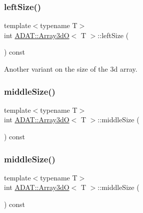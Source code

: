 \mbox{\label{classADAT_1_1Array3dO_a60f0fb62e8b93e6828fc98df271db054}} 
\subsubsection{\texorpdfstring{leftSize()}{leftSize()}\hspace{0.1cm}{\footnotesize\ttfamily [3/3]}}
{\footnotesize\ttfamily template$<$typename T$>$ \\
int \mbox{\hyperlink{classADAT_1_1Array3dO}{A\+D\+A\+T\+::\+Array3dO}}$<$ T $>$\+::left\+Size (\begin{DoxyParamCaption}{ }\end{DoxyParamCaption}) const\hspace{0.3cm}{\ttfamily [inline]}}



Another variant on the size of the 3d array. 

\mbox{\label{classADAT_1_1Array3dO_aff38cae908364701dc0fefd386223c55}} 
\subsubsection{\texorpdfstring{middleSize()}{middleSize()}\hspace{0.1cm}{\footnotesize\ttfamily [1/3]}}
{\footnotesize\ttfamily template$<$typename T$>$ \\
int \mbox{\hyperlink{classADAT_1_1Array3dO}{A\+D\+A\+T\+::\+Array3dO}}$<$ T $>$\+::middle\+Size (\begin{DoxyParamCaption}{ }\end{DoxyParamCaption}) const\hspace{0.3cm}{\ttfamily [inline]}}

\mbox{\label{classADAT_1_1Array3dO_aff38cae908364701dc0fefd386223c55}} 
\subsubsection{\texorpdfstring{middleSize()}{middleSize()}\hspace{0.1cm}{\footnotesize\ttfamily [2/3]}}
{\footnotesize\ttfamily template$<$typename T$>$ \\
int \mbox{\hyperlink{classADAT_1_1Array3dO}{A\+D\+A\+T\+::\+Array3dO}}$<$ T $>$\+::middle\+Size (\begin{DoxyParamCaption}{ }\end{DoxyParamCaption}) const\hspace{0.3cm}{\ttfamily [inline]}}

